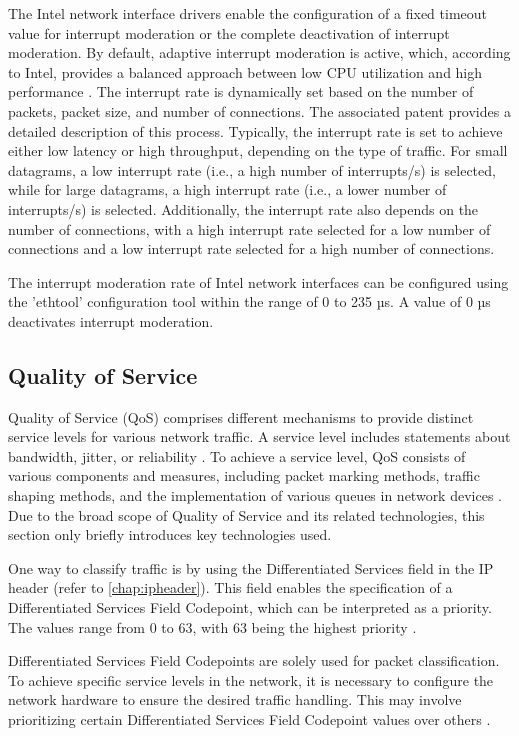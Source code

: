 The Intel network interface drivers enable the configuration of a fixed timeout value for interrupt moderation or the complete deactivation of interrupt moderation. By default, adaptive interrupt moderation is active, which, according to Intel, provides a balanced approach between low CPU utilization and high performance \cite{intermod03}. The interrupt rate is dynamically set based on the number of packets, packet size, and number of connections. The associated patent \cite{intermod04} provides a detailed description of this process. Typically, the interrupt rate is set to achieve either low latency or high throughput, depending on the type of traffic. For small datagrams, a low interrupt rate (i.e., a high number of interrupts/s) is selected, while for large datagrams, a high interrupt rate (i.e., a lower number of interrupts/s) is selected. Additionally, the interrupt rate also depends on the number of connections, with a high interrupt rate selected for a low number of connections and a low interrupt rate selected for a high number of connections.

The interrupt moderation rate of Intel network interfaces can be configured using the 'ethtool' configuration tool within the range of 0 to 235 µs. A value of 0 µs deactivates interrupt moderation.

\subsection{Quality of Service} \label{background:tuning:qualityofservice}
Quality of Service (QoS) comprises different mechanisms to provide distinct service levels for various network traffic. A service level includes statements about bandwidth, jitter, or reliability \cite{qos01}. To achieve a service level, QoS consists of various components and measures, including packet marking methods, traffic shaping methods, and the implementation of various queues in network devices \cite{qos02}. Due to the broad scope of Quality of Service and its related technologies, this section only briefly introduces key technologies used.

One way to classify traffic is by using the Differentiated Services field in the IP header (refer to \ref{chap:ipheader}). This field enables the specification of a Differentiated Services Field Codepoint, which can be interpreted as a priority. The values range from 0 to 63, with 63 being the highest priority \cite{qos02}.

Differentiated Services Field Codepoints are solely used for packet classification. To achieve specific service levels in the network, it is necessary to configure the network hardware to ensure the desired traffic handling. This may involve prioritizing certain Differentiated Services Field Codepoint values over others \cite{qos02}.

